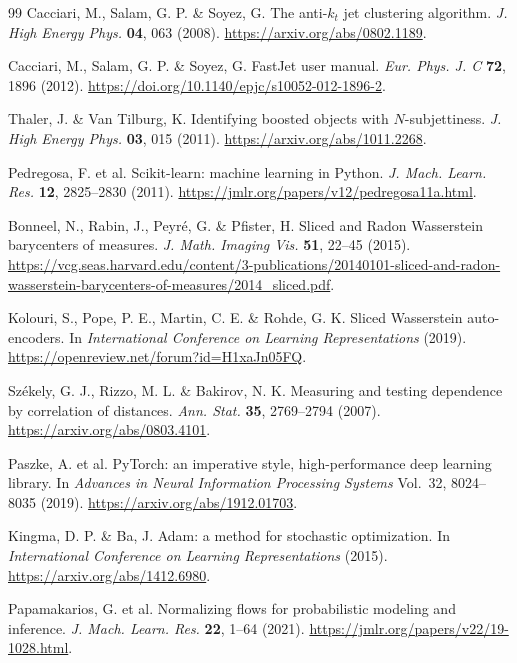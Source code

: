 \documentclass[11pt,a4paper]{article}
\begin{document}
\begin{thebibliography}{99}
 Cacciari, M., Salam, G. P. \& Soyez, G. The anti-$k_t$ jet clustering algorithm. \textit{J. High Energy Phys.} \textbf{04}, 063 (2008). \url{https://arxiv.org/abs/0802.1189}.

 Cacciari, M., Salam, G. P. \& Soyez, G. FastJet user manual. \textit{Eur. Phys. J. C} \textbf{72}, 1896 (2012). \url{https://doi.org/10.1140/epjc/s10052-012-1896-2}.

 Thaler, J. \& Van Tilburg, K. Identifying boosted objects with $N$-subjettiness. \textit{J. High Energy Phys.} \textbf{03}, 015 (2011). \url{https://arxiv.org/abs/1011.2268}.

 Pedregosa, F. et al. Scikit-learn: machine learning in Python. \textit{J. Mach. Learn. Res.} \textbf{12}, 2825--2830 (2011). \url{https://jmlr.org/papers/v12/pedregosa11a.html}.

 Bonneel, N., Rabin, J., Peyr\'e, G. \& Pfister, H. Sliced and Radon Wasserstein barycenters of measures. \textit{J. Math. Imaging Vis.} \textbf{51}, 22--45 (2015). \url{https://vcg.seas.harvard.edu/content/3-publications/20140101-sliced-and-radon-wasserstein-barycenters-of-measures/2014_sliced.pdf}.

 Kolouri, S., Pope, P. E., Martin, C. E. \& Rohde, G. K. Sliced Wasserstein auto-encoders. In \textit{International Conference on Learning Representations} (2019). \url{https://openreview.net/forum?id=H1xaJn05FQ}.

 Sz\'ekely, G. J., Rizzo, M. L. \& Bakirov, N. K. Measuring and testing dependence by correlation of distances. \textit{Ann. Stat.} \textbf{35}, 2769--2794 (2007). \url{https://arxiv.org/abs/0803.4101}.

 Paszke, A. et al. PyTorch: an imperative style, high-performance deep learning library. In \textit{Advances in Neural Information Processing Systems} Vol.~32, 8024--8035 (2019). \url{https://arxiv.org/abs/1912.01703}.

 Kingma, D. P. \& Ba, J. Adam: a method for stochastic optimization. In \textit{International Conference on Learning Representations} (2015). \url{https://arxiv.org/abs/1412.6980}.

 Papamakarios, G. et al. Normalizing flows for probabilistic modeling and inference. \textit{J. Mach. Learn. Res.} \textbf{22}, 1--64 (2021). \url{https://jmlr.org/papers/v22/19-1028.html}.


\end{thebibliography}
\end{document}
